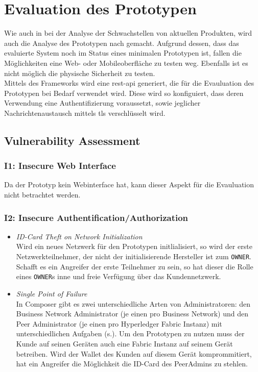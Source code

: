 \section{Evaluation des Prototypen}
\label{sec:evaluation}
    Wie auch in  bei der Analyse der Schwachstellen von aktuellen Produkten, wird auch die Analyse des Prototypen nach \cite{Miessler} gemacht. 
    Aufgrund dessen, dass das evaluierte System noch im Status eines minimalen Prototypen ist, fallen die Möglichkeiten eine Web- oder Mobileoberfläche zu testen weg. 
    Ebenfalls ist es nicht möglich die physische Sicherheit zu testen.
    \medskip\\
    Mittels des Frameworks wird eine \gls{rest}-\gls{api} generiert, die für die Evauluation des Prototypen bei Bedarf verwendet wird. 
    Diese wird so konfiguiert, dass deren Verwendung eine Authentifizierung voraussetzt, sowie jeglicher Nachrichtenaustausch mittels \gls{tls} verschlüsselt wird.

    \subsection{Vulnerability Assessment}
        \subsubsection*{I1: Insecure Web Interface}
            Da der Prototyp kein Webinterface hat, kann dieser Aspekt für die Evauluation nicht betrachtet werden.
           
        \subsubsection*{I2: Insecure Authentification/Authorization}
            \begin{itemize}[leftmargin=0cm,label={}]
    	        \item \emph{ID-Card Theft on Network Initialization}\label{vuln:prototype_id_theft}\\
    	            Wird ein neues Netzwerk für den Prototypen initlialisiert, so wird der erste Netzwerkteilnehmer, der nicht der initialisierende Hersteller ist zum \colorbox{light-gray}{\lstinline{OWNER}}. 
    	            Schafft es ein Angreifer der erste Teilnehmer zu sein, so hat dieser die Rolle eines \colorbox{light-gray}{\lstinline{OWNER}}s inne und freie Verfügung über das Kundennetzwerk.
    	        \item \emph{Single Point of Failure}\label{vuln:prototype_spf}\\
                    In Composer gibt es zwei unterschiedliche Arten von Administratoren: den Business Network Administrator (je einen pro Business Network) und den Peer Administrator (je einen pro Hyperledger Fabric Instanz) mit unterschiedlichen Aufgaben (s.). 
                    Um den Prototypen zu nutzen muss der Kunde auf seinen Geräten auch eine Fabric Instanz auf seinem Gerät betreiben. 
                    Wird der Wallet des Kunden auf diesem Gerät komprommitiert, hat ein Angreifer die Möglichkeit die ID-Card des PeerAdmins zu stehlen. 
            \end{itemize}
            
